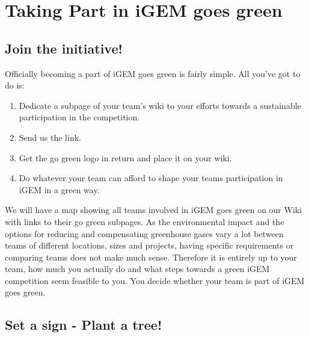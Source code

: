 
\chapter{Taking Part in iGEM goes green}\label{chap:takingpart}

\section{Join the initiative!}
Officially becoming a part of iGEM goes green is fairly simple. All you've got to do is:
\begin{enumerate}
	\item Dedicate a subpage of your team's wiki to your efforts towards a sustainable participation in the competition. 
	\item Send us the link.
	\item Get the go green logo in return and place it on your wiki.
	\item Do whatever your team can afford to shape your teams participation in iGEM in a green way.
	
\end{enumerate}
We will have a map showing all teams involved in iGEM goes green on our Wiki with links to their go green subpages. As the environmental impact and the options for reducing and compensating greenhouse gases vary a lot between teams of different locations, sizes and projects, having specific requirements or comparing teams does not make much sense. Therefore it is entirely up to your team, how much you actually do and what steps towards a green iGEM competition seem feasible to you. You decide whether your team is part of iGEM goes green.


\section{Set a sign - Plant a tree!}\label{sec:trees}


